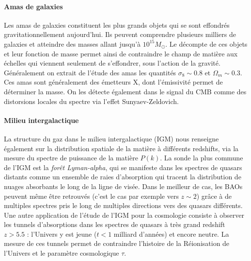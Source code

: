 \paragraph{Amas de galaxies}
Les amas de galaxies constituent les plus grands objets qui se sont effondrés gravitationnellement aujourd'hui. Ils peuvent comprendre plusieurs milliers de galaxies et atteindre des masses allant jusqu'à $10^{15} M_\odot$. Le décompte de ces objets et leur fonction de masse permet ainsi de contraindre le champ de matière aux échelles qui viennent seulement de s'effondrer, sous l'action de la gravité. Généralement on extrait de l'étude des amas les quantités $\sigma_8\sim 0.8$ et $\Omega_m\sim0.3$. Ces amas sont généralement des émetteurs X, dont l'émissivité permet de déterminer la masse. On les détecte également dans le signal du CMB comme des distorsions locales du spectre via l'effet Sunyaev-Zeldovich.

\paragraph{Milieu intergalactique}
La structure du gaz dans le milieu intergalactique (IGM) nous renseigne également sur la distribution spatiale de la matière à différents redshifts, via la mesure du spectre de puissance de la matière $P(k)$. La sonde la plus commune de l'IGM est la \textit{forêt Lyman-alpha}, qui se manifeste dans les spectres de quasars distants comme un ensemble de raies d'absorption qui tracent la distribution de nuages absorbants le long de la ligne de visée. Dans le meilleur de cas, les BAOs peuvent même être retrouvés (c'est le cas par exemple vers $z\sim2$) grâce à de multiples spectres pris le long de multiples directions vers des quasars différents. Une autre application de l'étude de l'IGM pour la cosmologie consiste à observer les tunnels d'absorptions dans les spectres de quasars à très grand redshift $z>5.5$ : l'Univers y est jeune ($t<1$ milliard d'années) et encore neutre. La mesure de ces tunnels permet de contraindre l'histoire de la Réionisation de l'Univers et le paramètre cosmologique $\tau$.

